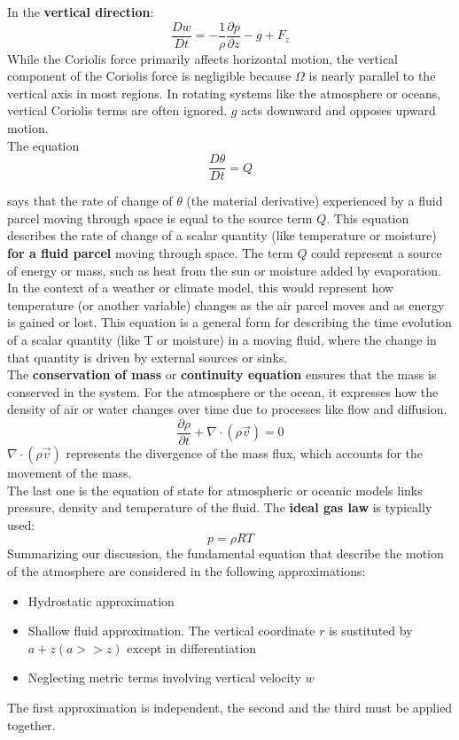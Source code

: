 In the \textbf{vertical direction}:
\begin{equation}
    \frac{Dw}{Dt}=-\frac{1}{\rho}\frac{\partial p}{\partial z}-g+F_z
\end{equation}
While the Coriolis force primarily affects horizontal motion, the vertical component of the Coriolis force is negligible because $\Omega$ is nearly parallel to the vertical axis in most regions. In rotating systems like the atmosphere or oceans, vertical Coriolis terms are often ignored. $g$ acts downward and opposes upward motion. 
\\
 

The equation
\begin{equation}
    \frac{D\theta}{Dt}=Q
\end{equation}

says that the rate of change of $\theta$ (the material derivative) experienced by a fluid parcel moving through space is equal to the source term $Q$. This equation describes the rate of change of a scalar quantity (like temperature or moisture) \textbf{for a fluid parcel} moving through space. The term $Q$ could represent a source of energy or mass, such as heat from the sun or moisture added by evaporation. In the context of a weather or climate model, this would represent how temperature (or another variable) changes as the air parcel moves and as energy is gained or lost. 
This equation is a general form for describing the time evolution of a scalar quantity (like T or moisture) in a moving fluid, where the change in that quantity is driven by external sources or sinks.
\\



The \textbf{conservation of mass} or \textbf{continuity equation }ensures that the mass is conserved in the system. For the atmosphere or the ocean, it expresses how the density of air or water changes over time due to processes like flow and diffusion.
\begin{equation}
    \frac{\partial\rho}{\partial t}+\nabla\cdot(\rho\vec{v})=0
\end{equation}
$\nabla\cdot(\rho\vec{v})$ represents the divergence of the mass flux, which accounts for the movement of the mass.
\\
The last one is the equation of state for atmospheric or oceanic models links pressure, density and temperature of the fluid. The \textbf{ideal gas law} is typically used:
\begin{equation}
    p=\rho RT
\end{equation}
Summarizing our discussion, the fundamental equation that describe the
motion of the atmosphere are considered in the following approximations:
\begin{itemize}
    \item Hydrostatic approximation
    \item Shallow fluid approximation. The vertical coordinate $r$ is sustituted by $a+z(a>>z)$ except in differentiation
    \item Neglecting metric terms involving vertical velocity $w$
\end{itemize}
The first approximation is independent, the second and the third must be applied together.
